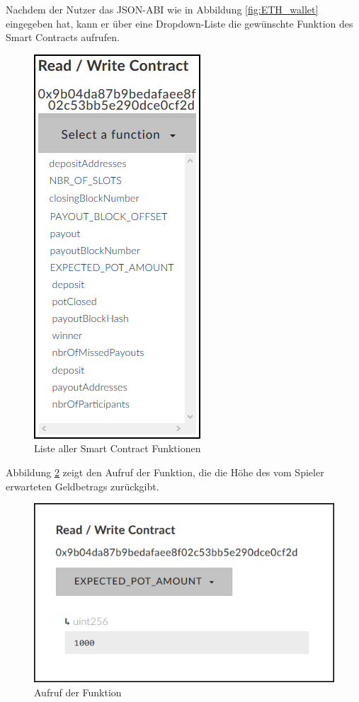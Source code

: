 \noindent Nachdem der Nutzer das JSON-ABI wie in Abbildung \ref{fig:ETH_wallet} eingegeben hat, kann er über eine Dropdown-Liste die gewünschte Funktion des Smart Contracts aufrufen.


\begin{figure}[H]
\centering
\includegraphics[scale=0.80]{Figures/eth_gui/ETH_wallet_contract_functions}
\decoRule
\caption{Liste aller Smart Contract Funktionen}
\label{fig:ETH_wallet_contract_functions}
\end{figure}

\noindent Abbildung \ref{fig:ETH_wallet_expected_amount} zeigt den Aufruf der Funktion, die die Höhe des vom Spieler erwarteten Geldbetrags zurückgibt.

\begin{figure}[H]
\centering
\includegraphics[scale=0.65]{Figures/eth_gui/ETH_wallet_expected_amount}
\decoRule
\caption{Aufruf der  Funktion}
\label{fig:ETH_wallet_expected_amount}
\end{figure}

